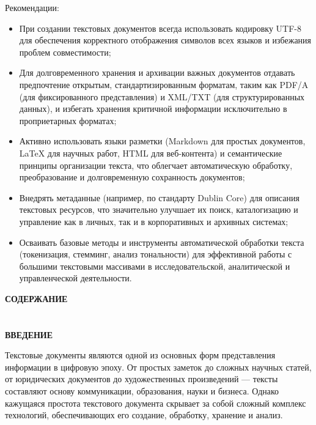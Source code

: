 \documentclass{SibFU-docs}
\begin{document}
Рекомендации:
\begin{itemize}[label=-]
\item При создании текстовых документов всегда использовать кодировку UTF-8 для обеспечения корректного отображения символов всех языков и избежания проблем совместимости;
\item Для долговременного хранения и архивации важных документов отдавать предпочтение открытым, стандартизированным форматам, таким как PDF/A (для фиксированного представления) и XML/TXT (для структурированных данных), и избегать хранения критичной информации исключительно в проприетарных форматах;
\item Активно использовать языки разметки (Markdown для простых документов, LaTeX для научных работ, HTML для веб-контента) и семантические принципы организации текста, что облегчает автоматическую обработку, преобразование и долговременную сохранность документов;
\item Внедрять метаданные (например, по стандарту Dublin Core) для описания текстовых ресурсов, что значительно улучшает их поиск, каталогизацию и управление как в личных, так и в корпоративных и архивных системах;
\item Осваивать базовые методы и инструменты автоматической обработки текста (токенизация, стемминг, анализ тональности) для эффективной работы с большими текстовыми массивами в исследовательской, аналитической и управленческой деятельности.
\end{itemize}

\newpage

\thispagestyle{empty}
\begin{center}
\bfseries СОДЕРЖАНИЕ
\end{center}
\vspace{-6pt}
\tableofcontents
\clearpage

\section*{}
\vspace*{-2.5em}
\begin{center}\textbf{ВВЕДЕНИЕ}\end{center}
{}

Текстовые документы являются одной из основных форм представления информации в цифровую эпоху. От простых заметок до сложных научных статей, от юридических документов до художественных произведений — тексты составляют основу коммуникации, образования, науки и бизнеса. Однако кажущаяся простота текстового документа скрывает за собой сложный комплекс технологий, обеспечивающих его создание, обработку, хранение и анализ.
\end{document}
